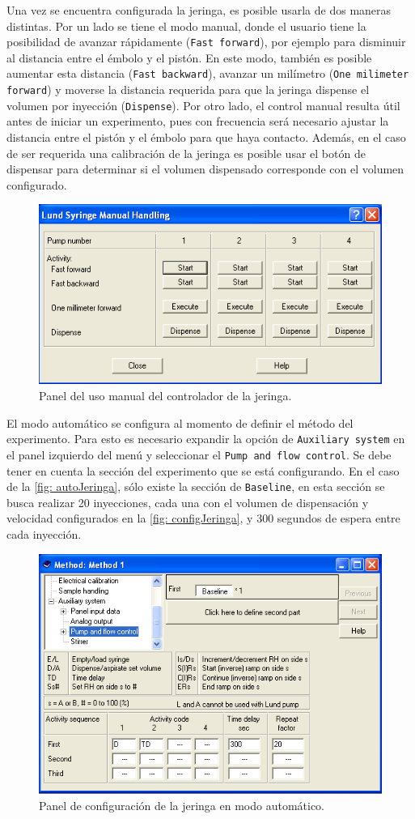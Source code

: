 	Una vez se encuentra configurada la jeringa, es posible usarla de dos maneras distintas. Por un lado se tiene el modo manual, donde el usuario tiene la posibilidad de avanzar rápidamente (\texttt{Fast forward}), por ejemplo para disminuir al distancia entre el émbolo y el pistón. En este modo, también es posible aumentar esta distancia (\texttt{Fast backward}), avanzar un milímetro (\texttt{One milimeter forward}) y moverse la distancia requerida para que la jeringa dispense el volumen por inyección (\texttt{Dispense}). Por otro lado, el control manual resulta útil antes de iniciar un experimento, pues con frecuencia será necesario ajustar la distancia entre el pistón y el émbolo para que haya contacto. Además, en el caso de ser requerida una calibración de la jeringa es posible usar el botón de dispensar para determinar si el volumen dispensado corresponde con el volumen configurado.
	\begin{figure}[h]
		\centering
		\includegraphics[width=0.5\linewidth]{Figures/jeringa_manual}
		\caption{Panel del uso manual del controlador de la jeringa.}
		\label{fig: manualJeringa}
	\end{figure}
	
	El modo automático se configura al momento de definir el método del experimento. Para esto es necesario expandir la opción de \texttt{Auxiliary system} en el panel izquierdo del menú y seleccionar el  \texttt{Pump and flow control}. Se debe tener en cuenta la sección del experimento que se está configurando. En el caso de la \autoref{fig: autoJeringa}, sólo existe la sección de \texttt{Baseline}, en esta sección se busca realizar 20 inyecciones, cada una con el volumen de dispensación y velocidad configurados en la \autoref{fig: configJeringa}, y 300 segundos de espera entre cada inyección.
	\begin{figure}[h]
		\centering
		\includegraphics[width=0.5\linewidth]{Figures/jeringa_experimento}
		\caption{Panel de configuración de la jeringa en modo automático.}
		\label{fig: autoJeringa}
	\end{figure}
	
